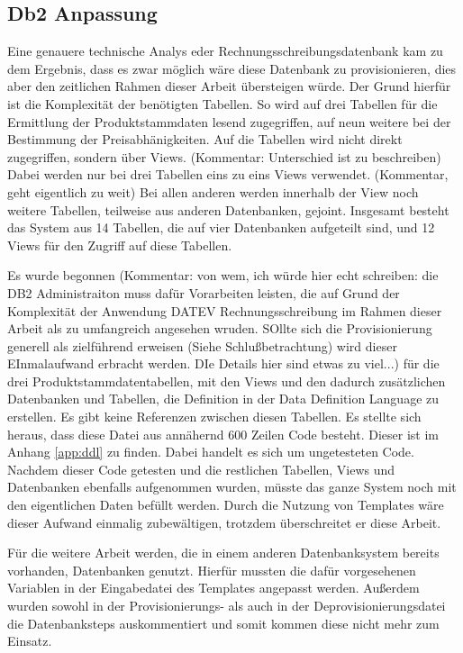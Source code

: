 \subsection{Db2 Anpassung}\label{ssec:db2entw}
Eine genauere technische Analys eder Rechnungsschreibungsdatenbank kam zu dem  Ergebnis, dass es zwar möglich wäre diese Datenbank zu provisionieren, dies aber den zeitlichen Rahmen dieser Arbeit übersteigen würde.
Der Grund hierfür ist die Komplexität der benötigten Tabellen.
So wird auf drei Tabellen für die Ermittlung der Produktstammdaten lesend zugegriffen, auf neun weitere bei der Bestimmung der Preisabhänigkeiten.
Auf die Tabellen wird nicht direkt zugegriffen, sondern über Views. (Kommentar: Unterschied ist zu beschreiben)
Dabei werden nur bei drei Tabellen eins zu eins Views verwendet. (Kommentar, geht eigentlich zu weit)
Bei allen anderen werden innerhalb der View noch weitere Tabellen, teilweise aus anderen Datenbanken, gejoint.
Insgesamt besteht das System aus 14 Tabellen, die auf vier Datenbanken aufgeteilt sind, und 12 Views für den Zugriff auf diese Tabellen.

Es wurde begonnen (Kommentar: von wem, ich würde hier echt schreiben: die DB2 Administraiton muss dafür Vorarbeiten leisten, die auf Grund der Komplexität der Anwendung DATEV Rechnungsschreibung im Rahmen dieser Arbeit als zu umfangreich angesehen wruden. SOllte sich die Provisionierung generell als zielführend erweisen (Siehe Schlußbetrachtung) wird dieser EInmalaufwand erbracht werden.  DIe Details hier sind etwas zu viel...)  für die drei Produktstammdatentabellen, mit den Views und den dadurch zusätzlichen Datenbanken und Tabellen, die Definition in der Data Definition Language zu erstellen.
Es gibt keine Referenzen zwischen diesen Tabellen.
Es stellte sich heraus, dass diese Datei aus annähernd 600 Zeilen Code besteht.
Dieser ist im Anhang \ref{app:ddl} zu finden.
Dabei handelt es sich um ungetesteten Code.
Nachdem dieser Code getesten und die restlichen Tabellen, Views und Datenbanken ebenfalls aufgenommen wurden, müsste das ganze System noch mit den eigentlichen Daten befüllt werden.
Durch die Nutzung von Templates wäre dieser Aufwand einmalig zubewältigen, trotzdem überschreitet er diese Arbeit.

Für die weitere Arbeit werden, die in einem anderen Datenbanksystem bereits vorhanden, Datenbanken genutzt.
Hierfür mussten die dafür vorgesehenen Variablen in der Eingabedatei des Templates angepasst werden.
Außerdem wurden sowohl in der Provisionierungs- als auch in der Deprovisionierungsdatei die Datenbanksteps auskommentiert und somit kommen diese nicht mehr zum Einsatz.


